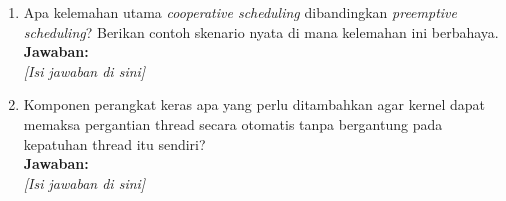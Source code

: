 \begin{enumerate}
    \begin{enumerate}
        \item[(a)] Apa kelemahan utama \textit{cooperative scheduling}
                   dibandingkan \textit{preemptive scheduling}?
                   Berikan contoh skenario nyata di mana kelemahan
                   ini berbahaya.\\[0.3cm]
                   \textbf{Jawaban:}\\
                   \textit{[Isi jawaban di sini]}

        \item[(b)] Komponen perangkat keras apa yang perlu ditambahkan
                   agar kernel dapat memaksa pergantian thread secara
                   otomatis tanpa bergantung pada kepatuhan thread
                   itu sendiri?\\[0.3cm]
                   \textbf{Jawaban:}\\
                   \textit{[Isi jawaban di sini]}
    \end{enumerate}

\end{enumerate}
